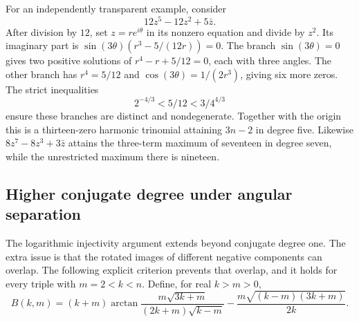 \documentclass[UTF8,11pt]{ctexart}
\theoremstyle{definition}
\numberwithin{equation}{section}
\begin{document}
For an independently transparent example, consider
\[
 12z^5-12z^2+5\bar z.
\]
After division by $12$, set $z=re^{i\theta}$ in its nonzero
equation and divide by $z^2$. Its imaginary part is
$\sin(3\theta)(r^3-5/(12r))=0$.
The branch $\sin(3\theta)=0$ gives two positive solutions of
$r^4-r+5/12=0$, each with three angles. The other branch has
$r^4=5/12$ and $\cos(3\theta)=1/(2r^3)$, giving six more zeros.
The strict inequalities
\[
 2^{-4/3}<5/12<3/4^{4/3}
\]
ensure these branches are distinct and nondegenerate.
Together with the origin this is a thirteen-zero harmonic
trinomial attaining $3n-2$ in degree five.
Likewise $8z^7-8z^3+3\bar z$ attains the three-term maximum
of seventeen in degree seven, while the unrestricted maximum
there is nineteen.


\subsection{Higher conjugate degree under angular separation}
\label{v12:sec:highertrinomials}

The logarithmic injectivity argument extends beyond conjugate degree
one. The extra issue is that the rotated images of different negative
components can overlap. The following explicit criterion prevents
that overlap, and it holds for every triple with $m=2<k<n$.
Define, for real $k>m>0$,
\begin{equation}\label{v12:eq:B}
 B(k,m)=(k+m)\arctan\frac{m\sqrt{3k+m}}
 {(2k+m)\sqrt{k-m}}
 -\frac{m\sqrt{(k-m)(3k+m)}}{2k}.
\end{equation}
\end{document}
